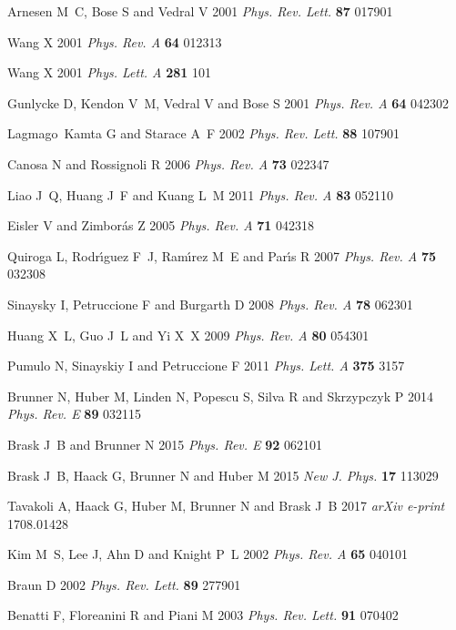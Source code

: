 \documentclass[12pt]{iopart}
\begin{document}
\begin{thebibliography}{10}
Arnesen M~C, Bose S and Vedral V 2001 {\em Phys. Rev. Lett.\/} {\bf 87} 017901

Wang X 2001 {\em Phys. Rev. A\/} {\bf 64} 012313

Wang X 2001 {\em Phys. Lett. A\/} {\bf 281} 101

Gunlycke D, Kendon V~M, Vedral V and Bose S 2001 {\em Phys. Rev. A\/} {\bf 64}
  042302

Lagmago~Kamta G and Starace A~F 2002 {\em Phys. Rev. Lett.\/} {\bf 88} 107901

Canosa N and Rossignoli R 2006 {\em Phys. Rev. A\/} {\bf 73} 022347

Liao J~Q, Huang J~F and Kuang L~M 2011 {\em Phys. Rev. A\/} {\bf 83} 052110

Eisler V and Zimbor\'as Z 2005 {\em Phys. Rev. A\/} {\bf 71} 042318

Quiroga L, Rodr\'{\i}guez F~J, Ram\'{\i}rez M~E and Par\'{\i}s R 2007 {\em
  Phys. Rev. A\/} {\bf 75} 032308

Sinaysky I, Petruccione F and Burgarth D 2008 {\em Phys. Rev. A\/} {\bf 78}
  062301

Huang X~L, Guo J~L and Yi X~X 2009 {\em Phys. Rev. A\/} {\bf 80} 054301

Pumulo N, Sinayskiy I and Petruccione F 2011 {\em Phys. Lett. A\/} {\bf 375}
  3157

Brunner N, Huber M, Linden N, Popescu S, Silva R and Skrzypczyk P 2014 {\em
  Phys. Rev. E\/} {\bf 89} 032115

Brask J~B and Brunner N 2015 {\em Phys. Rev. E\/} {\bf 92} 062101

Brask J~B, Haack G, Brunner N and Huber M 2015 {\em New J. Phys.\/} {\bf 17}
  113029

Tavakoli A, Haack G, Huber M, Brunner N and Brask J~B 2017 {\em arXiv
  e-print\/}  1708.01428

Kim M~S, Lee J, Ahn D and Knight P~L 2002 {\em Phys. Rev. A\/} {\bf 65} 040101

Braun D 2002 {\em Phys. Rev. Lett.\/} {\bf 89} 277901

Benatti F, Floreanini R and Piani M 2003 {\em Phys. Rev. Lett.\/} {\bf 91}
  070402


\end{thebibliography}
\end{document}
